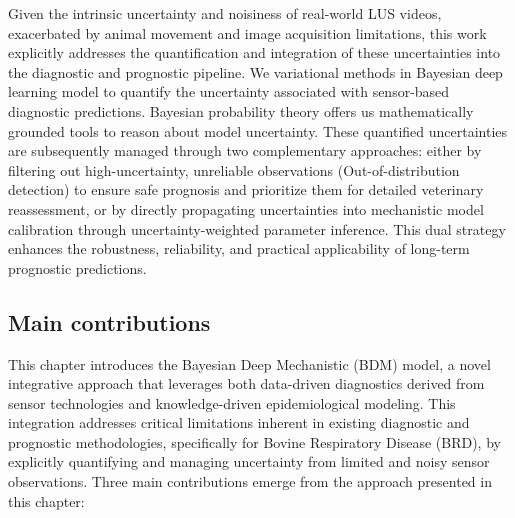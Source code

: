 Given the intrinsic uncertainty and noisiness of real-world LUS videos, exacerbated by animal movement and image acquisition limitations, this work explicitly addresses the quantification and integration of these uncertainties into the diagnostic and prognostic pipeline. We variational methods in Bayesian deep learning model to quantify the uncertainty associated with sensor-based diagnostic predictions. Bayesian probability theory offers us mathematically grounded tools to reason about model uncertainty. These quantified uncertainties are subsequently managed through two complementary approaches: either by filtering out high-uncertainty, unreliable observations (Out-of-distribution detection) to ensure safe prognosis and prioritize them for detailed veterinary reassessment, or by directly propagating uncertainties into mechanistic model calibration through uncertainty-weighted parameter inference. This dual strategy enhances the robustness, reliability, and practical applicability of long-term prognostic predictions.


\subsection{Main contributions}
This chapter introduces the Bayesian Deep Mechanistic (BDM) model, a novel integrative approach that leverages both data-driven diagnostics derived from sensor technologies and knowledge-driven epidemiological modeling. This integration addresses critical limitations inherent in existing diagnostic and prognostic methodologies, specifically for Bovine Respiratory Disease (BRD), by explicitly quantifying and managing uncertainty from limited and noisy sensor observations. Three main contributions emerge from the approach presented in this chapter:


